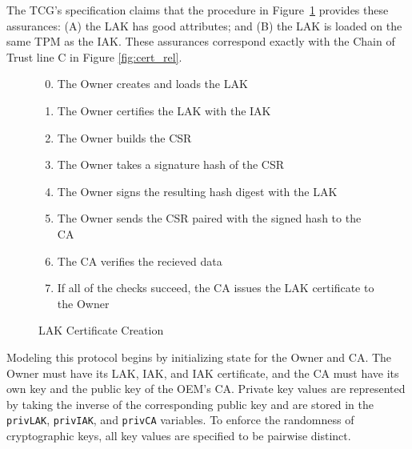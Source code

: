 \documentclass[runningheads]{llncs}
\begin{document}
The TCG's specification claims that the procedure in
Figure~\ref{fig:lak-certificate-creation} provides
these assurances: (A) the LAK has good attributes; and (B) the LAK is
loaded on the same TPM as the IAK. These assurances correspond exactly
with the Chain of Trust line C in Figure \ref{fig:cert_rel}.

\begin{figure}[hpbt]
\begin{enumerate}[itemsep=0pt,parsep=0pt,partopsep=0pt]
  \setcounter{enumi}{-1}
  \item The Owner creates and loads the LAK
  \item The Owner certifies the LAK with the IAK
  \item The Owner builds the CSR%
  \item The Owner takes a signature hash of the CSR
  \item The Owner signs the resulting hash digest with the LAK
  \item The Owner sends the CSR paired with the signed hash to the CA
  \item The CA verifies the recieved data%
  \item If all of the checks succeed, the CA issues the LAK certificate to the Owner
  \end{enumerate}
  \caption{LAK Certificate Creation}
  \label{fig:lak-certificate-creation}
\end{figure}

Modeling this protocol begins by initializing state for the Owner and
CA. The Owner must have its LAK, IAK, and IAK certificate, and the CA
must have its own key and the public key of the OEM's CA.  Private key
values are represented by taking the inverse of the corresponding
public key and are stored in the \verb|privLAK|, \verb|privIAK|, and
\verb|privCA| variables. To enforce the randomness of cryptographic
keys, all key values are specified to be pairwise distinct.
\end{document}
